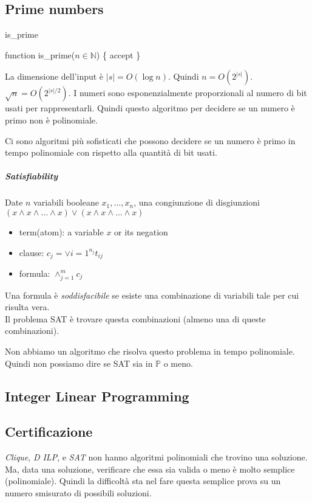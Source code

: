 \documentclass{article}
\newcommand{\N}[0]{\ensuremath{\mathbb{N}}}
\begin{document}
\subsection{Prime numbers}
\begin{algorithm}
    \caption{is\_prime}
    function is\_prime($n\in\N$) \{\;
        accept\;
    \}
\end{algorithm}

La dimensione dell'input è $|s| = O(\log n)$. Quindi $n=O(2^{|s|})$. $\sqrt{n}=O(2^{|s|/2})$. I numeri sono esponenzialmente proporzionali al numero di bit usati per rappresentarli. Quindi questo algoritmo per decidere se un numero è primo non è polinomiale.

Ci sono algoritmi più sofisticati che possono decidere se un numero è primo in tempo polinomiale con rispetto alla quantità di bit usati.

\subparagraph{Satisfiability}
Date $n$ variabili booleane $x_1,\dots,x_n$, una congiunzione di disgiunzioni $(x\wedge x\wedge\dots\wedge x) \vee (x\wedge x\wedge\dots\wedge x)$

\begin{itemize}
    \item term(atom): a variable $x$ or its negation
    \item clause: $c_j=\vee{i=1}^{n_j} t_{ij}$
    \item formula: $\wedge_{j=1}^m c_j$
\end{itemize}

Una formula è \textit{soddisfacibile} se esiste una combinazione di variabili tale per cui risulta vera.\\
Il problema SAT è trovare questa combinazioni (almeno una di queste combinazioni).

Non abbiamo un algoritmo che risolva questo problema in tempo polinomiale. Quindi non possiamo dire se SAT sia in $\mathbb{P}$ o meno.

\subsection{Integer Linear Programming}

\subsection{Certificazione}
\textit{Clique}, \textit{D ILP}, e \textit{SAT} non hanno algoritmi polinomiali che trovino una soluzione. Ma, data una soluzione, verificare che essa sia valida o meno è molto semplice (polinomiale). Quindi la difficoltà sta nel fare questa semplice prova su un numero smisurato di possibili soluzioni.
\end{document}
